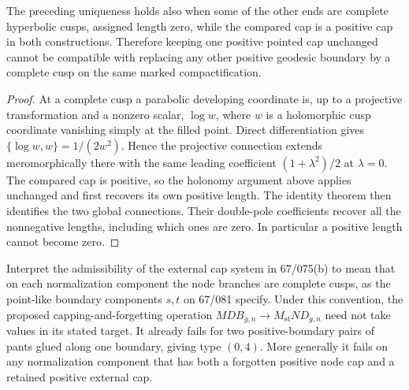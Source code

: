 \begin{corollary}
\label{A:single-cap-with-cusps}
The preceding uniqueness holds also when some of the other ends are
complete hyperbolic cusps, assigned length zero, while the compared
cap is a positive cap in both constructions. Therefore keeping one
positive pointed cap unchanged cannot be compatible with replacing
any other positive geodesic boundary by a complete cusp on the same
marked compactification.
\end{corollary}

\begin{proof}
At a complete cusp a parabolic developing coordinate is, up to a
projective transformation and a nonzero scalar, $\log w$, where
$w$ is a holomorphic cusp coordinate vanishing simply at the filled
point. Direct differentiation gives
$\{\log w,w\}=1/(2w^2)$. Hence the projective connection extends
meromorphically there with the same leading coefficient
$(1+\lambda^2)/2$ at $\lambda=0$. The compared cap is positive,
so the holonomy argument above applies unchanged and first recovers
its own positive length. The identity theorem then identifies the
two global connections. Their double-pole coefficients recover all
the nonnegative lengths, including which ones are zero. In
particular a positive length cannot become zero.
\end{proof}

\begin{proposition}
\label{A:MDB-forgetting-admissibility}
Interpret the admissibility of the external cap system in
67/075(b) to mean that on each normalization component the node
branches are complete cusps, as the point-like boundary components
$s,t$ on 67/081 specify. Under this convention, the proposed
capping-and-forgetting operation
$MDB_{g,n}\to M_{\mathrm{st}}ND_{g,n}$ need not take values in
its stated target. It already fails for two positive-boundary
pairs of pants glued along one boundary, giving type $(0,4)$.
More generally it fails on any normalization component that has
both a forgotten positive node cap and a retained positive
external cap.
\end{proposition}

